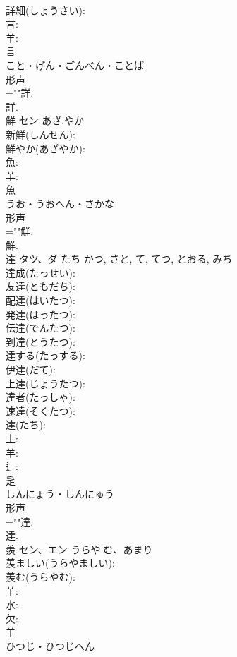 \documentclass[8pt]{extreport}
\begin{document}
\begin{CJK}{UTF8}{min}
\\	詳細(しょうさい): 
\\	言: 
\\	羊: 
\\	言	
\\	こと・げん・ごんべん・ことば	
\\	形声 
\\	=""詳.
\\	詳.
\\	鮮	セン	あざ.やか		
\\	新鮮(しんせん): 
\\	鮮やか(あざやか): 
\\	魚: 
\\	羊: 
\\	魚	
\\	うお・うおへん・さかな	
\\	形声 
\\	=""鮮.
\\	鮮.
\\	達	タツ、ダ	たち	かつ, さと, て, てつ, とおる, みち	
\\	達成(たっせい): 
\\	友達(ともだち): 
\\	配達(はいたつ): 
\\	発達(はったつ): 
\\	伝達(でんたつ): 
\\	到達(とうたつ): 
\\	達する(たっする): 
\\	伊達(だて): 
\\	上達(じょうたつ): 
\\	達者(たっしゃ): 
\\	速達(そくたつ): 
\\	達(たち): 
\\	土: 
\\	羊: 
\\	辶: 
\\	辵	
\\	しんにょう・しんにゅう	
\\	形声 
\\	=""達.
\\	達.
\\	羨	セン、エン	うらや.む、あまり		
\\	羨ましい(うらやましい): 
\\	羨む(うらやむ): 
\\	羊: 
\\	水: 
\\	欠: 
\\	羊	
\\	ひつじ・ひつじへん	

\end{CJK}
\end{document}
